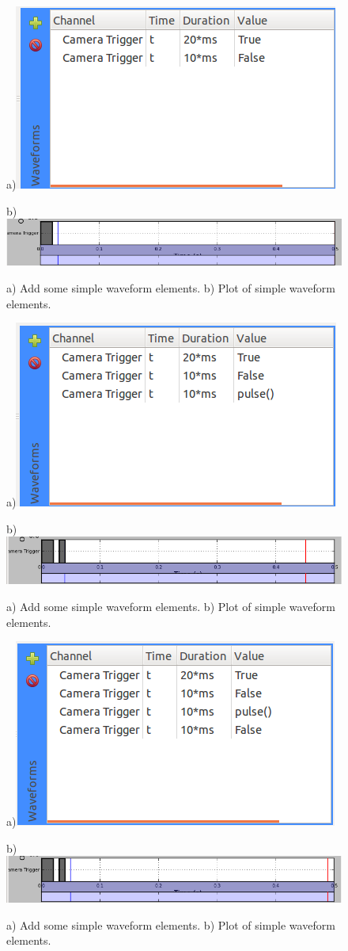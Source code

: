 \begin{enumerate}
\begin{enumerate}
        \begin{figure}[ht]
          \centerline{a)\includegraphics[width=.5\textwidth]{figures/waveform-0}}
          \centerline{b)\includegraphics[width=.8\textwidth]{figures/plot-0}}
          \caption{a) Add some simple waveform elements. b) Plot of simple
          waveform elements.}
          \label{fig:quick:waveform-0}
        \end{figure}

        \begin{figure}[ht]
          \centerline{a)\includegraphics[width=.5\textwidth]{figures/waveform-1}}
          \centerline{b)\includegraphics[width=.8\textwidth]{figures/plot-1}}
          \caption{a) Add some simple waveform elements. b) Plot of simple
          waveform elements.}
          \label{fig:quick:waveform-1}
        \end{figure}

        \begin{figure}[ht]
          \centerline{a)\includegraphics[width=.5\textwidth]{figures/waveform-2}}
          \centerline{b)\includegraphics[width=.8\textwidth]{figures/plot-2}}
          \caption{a) Add some simple waveform elements. b) Plot of simple
          waveform elements.}
          \label{fig:quick:waveform-2}
        \end{figure}


\end{enumerate}
\end{enumerate}
